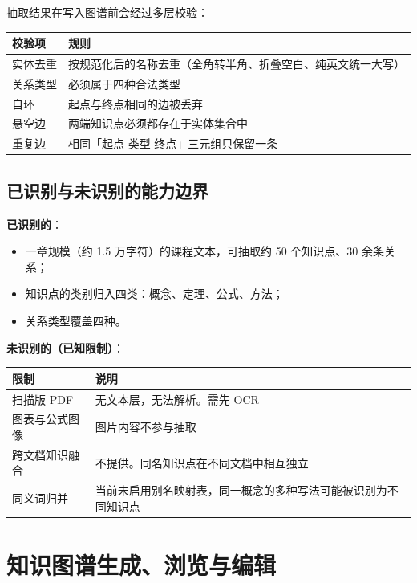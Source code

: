\documentclass[UTF8,a4paper,11pt]{ctexrep}
\begin{document}
抽取结果在写入图谱前会经过多层校验：

\begin{center}
\small
\begin{tabularx}{\linewidth}{@{}XX@{}}
\toprule
校验项 & 规则 \\
\midrule
实体去重 & 按规范化后的名称去重（全角转半角、折叠空白、纯英文统一大写） \\
关系类型 & 必须属于四种合法类型 \\
自环 & 起点与终点相同的边被丢弃 \\
悬空边 & 两端知识点必须都存在于实体集合中 \\
重复边 & 相同「起点-类型-终点」三元组只保留一条 \\
\bottomrule
\end{tabularx}
\end{center}

\subsection{已识别与未识别的能力边界}

\textbf{已识别的}：

\begin{itemize}
\item 一章规模（约 1.5 万字符）的课程文本，可抽取约 50 个知识点、30 余条关系；
\item 知识点的类别归入四类：概念、定理、公式、方法；
\item 关系类型覆盖四种。
\end{itemize}
\textbf{未识别的（已知限制）}：

\begin{center}
\small
\begin{tabularx}{\linewidth}{@{}XX@{}}
\toprule
限制 & 说明 \\
\midrule
扫描版 PDF & 无文本层，无法解析。需先 OCR \\
图表与公式图像 & 图片内容不参与抽取 \\
跨文档知识融合 & 不提供。同名知识点在不同文档中相互独立 \\
同义词归并 & 当前未启用别名映射表，同一概念的多种写法可能被识别为不同知识点 \\
\bottomrule
\end{tabularx}
\end{center}

\section{知识图谱生成、浏览与编辑}
\end{document}
